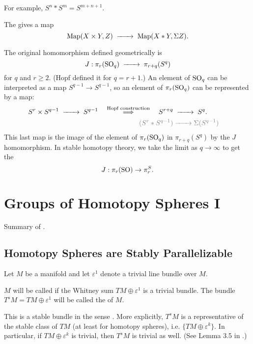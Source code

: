 For example, $S^n * S^m = S^{m+n+1}$.

\begin{definition}
	The  gives a map
	\[
		\Map(X\times Y, Z) \lkxto \Map(X * Y, \Sigma Z).
	\]
\end{definition}

The original homomorphism defined geometrically is
\[
		J : \pi_r(\SO_q) \lkxto \pi_{r+q}(S^q)
\]
for $q$ and $r\geq 2$. (Hopf defined it for $q=r+1$.) An element of $\operatorname{SO}_q$ can be interpreted as a map $S^{q-1} \to S^{q-1}$, so an element of $\pi_r(\operatorname{SO}_q)$ can be represented by a map:
\[
	\begin{aligned}
	S^r \times S^{q-1} \lkxto S^{q-1} \quad\overset{\textrm{Hopf construction}}{\implies}\quad 
	 S^{r+q} &\lkxto S^q.\phantom{(S^{q-1})}\\
	 \textcolor{gray}{(S^r * S^{q-1})} &\textcolor{gray}{\lkxto} \textcolor{gray}{\Sigma (S^{q-1})}
\end{aligned}
\]
This last map is the image of the element of $\pi_r(\operatorname{SO}_q)$ in $\pi_{r+q}(S^q)$ by the $J$ homomorphism. In stable homotopy theory, we take the limit as $q\to \infty$ to get the 
\[
		J : \pi_r(\operatorname{SO}) \to \pi_r^S.
\]

\chapter{Groups of Homotopy Spheres I}

Summary of \cite{milnor1963groups}.

\section{Homotopy Spheres are Stably Parallelizable}

Let $M$ be a manifold and let $\varepsilon^1$ denote a trivial line bundle over $M$.

\begin{definition}
	$M$ will be called  if the Whitney sum $TM \oplus \varepsilon^1$ is  a trivial bundle. The bundle $T^sM = TM\oplus\varepsilon^1$ will be called the  of $M$.
\end{definition}

This is a stable bundle in the sense \cite{kervaire1959}. More explicitly, $T^sM$ is a representative of the stable class of $TM$ (at least for homotopy spheres), i.e. $\{TM\oplus \varepsilon^k\}$. In particular, if $TM\oplus \varepsilon^k$ is trivial, then $T^s M$ is trivial as well. (See Lemma 3.5 in \cite{milnor1963groups}.)

